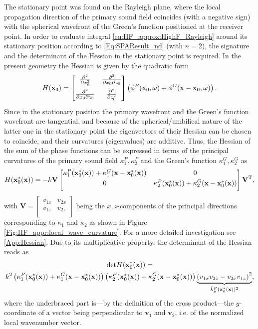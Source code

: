 The stationary point was found on the Rayleigh plane, where the local propagation direction of the primary sound field coincides (with a negative sign) with the spherical wavefront of the Green's function positioned at the receiver point. 
In order to evaluate integral \eqref{eq:HF_approx:HighF_Rayleigh} around its stationary position according to \eqref{Eq:SPAResult_nd} (with $n=2$), the signature and the determinant of the Hessian in the stationary point is required.
In the present geometry the Hessian is given by the quadratic form
\begin{equation}
H(\mathbf{x}_0) =
\begin{bmatrix} 
\frac{\partial^2}{\partial x_0^2} & \frac{\partial^2}{\partial x_0 \partial z_0} \\[.7em]
\frac{\partial^2}{\partial x_0 \partial z_0} & \frac{\partial^2}{\partial z_0^2}\\[0.5em] \end{bmatrix} 
\left( \phi^P(\mathbf{x}_0,\omega) + \phi^G(\mathbf{x}-\mathbf{x}_0,\omega)  \right).
\end{equation}
Since in the stationary position the primary wavefront and the Green's function wavefront are tangential, and because of the spherical/umbilical nature of the latter one in the stationary point the eigenvectors of their Hessian can be chosen to coincide, and their curvatures (eigenvalues) are additive.
Thus, the Hessian of the sum of the phase functions can be expressed in terms of the principal curvatures of the primary sound field $\kappa_1^P, \kappa_2^P$ and the Green's function $\kappa_1^G, \kappa_2^G$ as
\begin{equation}
H(\mathbf{x}_0^*(\mathbf{x})) = -k
\mathbf{V}
\begin{bmatrix} 
\kappa_1^P(\mathbf{x}_0^*(\mathbf{x})) + \kappa_1^G(\mathbf{x}-\mathbf{x}_0^*(\mathbf{x})) & 0 \\[.3em]
0 & \kappa_2^P(\mathbf{x}_0^*(\mathbf{x})) + \kappa_2^G(\mathbf{x}-\mathbf{x}_0^*(\mathbf{x})) \\[.5em] \end{bmatrix}
\mathbf{V}^{\mathrm{T}},
\end{equation}
with $\mathbf{V} = \begin{bmatrix} 
v_{1 x} & v_{2 x} \\[.1em]
v_{1 z} & v_{2 z}\\[.3em] \end{bmatrix}$ being the $x,z$-components of the principal directions corresponding to $\kappa_1$ and $\kappa_2$ as shown in Figure \ref{Fig:HF_appr:local_wave_curvature}.
For a more detailed investigation see \ref{App:Hessian}.
Due to its multiplicative property, the determinant of the Hessian reads as
\begin{multline}
\label{Eq:HF_approx:H_det_Rayleigh}
\small
\mathrm{det} H(\mathbf{x}_0^*(\mathbf{x})) = \\ k^2
\left(\kappa_1^P(\mathbf{x}_0^*(\mathbf{x})) + \kappa_1^G(\mathbf{x}-\mathbf{x}_0^*(\mathbf{x}))\right)
\left(\kappa_2^P(\mathbf{x}_0^*(\mathbf{x})) + \kappa_2^G(\mathbf{x}-\mathbf{x}_0^*(\mathbf{x}))\right)
\underbrace{\left( v_{1 x}v_{2 z}-v_{2 x}v_{1 z} \right)^2}_{\hat{k}_y^P(\mathbf{x}_0^*(\mathbf{x}))^2},
\end{multline}
where the underbraced part is---by the definition of the cross product---the $y$-coordinate of a vector being perpendicular to $\mathbf{v}_1$ and $\mathbf{v}_2$, i.e. of the normalized local wavenumber vector.

